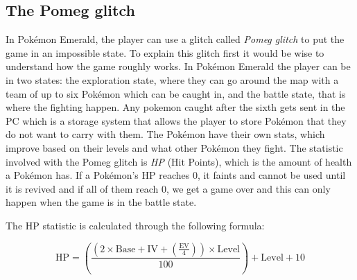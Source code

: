 \documentclass[a4paper]{usiinfbachelorproject}
\begin{document}
\subsection{\textbf{The Pomeg glitch}}
In Pokémon Emerald, the player can use a glitch called \textit{Pomeg glitch} to put the game in an impossible state. To explain this glitch first it would be wise to understand how the game roughly works. In Pokémon Emerald the player can be in two states: the exploration state, where they can go around the map with a team of up to six Pokémon which can be caught in, and the battle state, that is where the fighting happen. Any pokemon caught after the sixth gets sent in the PC which is a storage system that allows the player to store Pokémon that they do not want to carry with them. The Pokémon have their own stats, which improve based on their levels and what other Pokémon they fight. The statistic involved with the Pomeg glitch is \textit{HP} (Hit Points), which is the amount of health a Pokémon has. If a Pokémon's HP reaches 0, it faints and cannot be used until it is revived and if all of them reach 0, we get a game over and this can only happen when the game is in the battle state.

The HP statistic is calculated through the following formula:

\begin{equation}
	\text{HP} = \left( \frac{(2 \times \text{Base} + \text{IV} + \left( \frac{\text{EV}}{4} \right)) \times \text{Level}}{100} \right) + \text{Level} + 10
	\label{eq:ergodic_hypothesis}
\end{equation}
\end{document}
